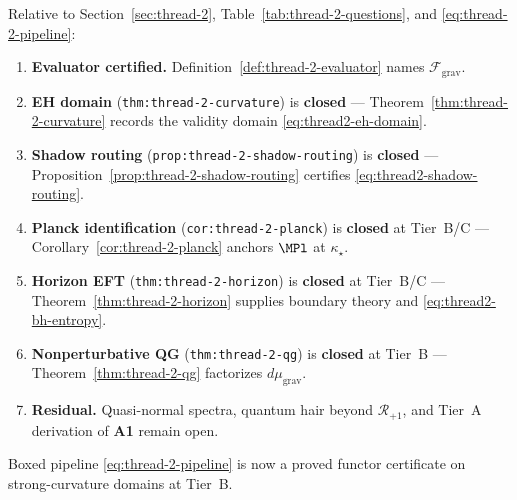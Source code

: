 \begin{corollary}
\label{cor:thread-2-closure}
Relative to Section~\ref{sec:thread-2}, Table~\ref{tab:thread-2-questions},
and \eqref{eq:thread-2-pipeline}:
\begin{enumerate}[label=(\roman*),leftmargin=*]
  \item \textbf{Evaluator certified.}
    Definition~\ref{def:thread-2-evaluator} names $\mathcal{F}_{\mathrm{grav}}$.
  \item \textbf{EH domain}
    (\texttt{thm:thread-2-curvature}) is \textbf{closed} ---
    Theorem~\ref{thm:thread-2-curvature} records the validity domain
    \eqref{eq:thread2-eh-domain}.
  \item \textbf{Shadow routing}
    (\texttt{prop:thread-2-shadow-routing}) is \textbf{closed} ---
    Proposition~\ref{prop:thread-2-shadow-routing} certifies
    \eqref{eq:thread2-shadow-routing}.
  \item \textbf{Planck identification}
    (\texttt{cor:thread-2-planck}) is \textbf{closed} at Tier~B/C ---
    Corollary~\ref{cor:thread-2-planck} anchors $\MPl$ at $\kappa_\star$.
  \item \textbf{Horizon EFT}
    (\texttt{thm:thread-2-horizon}) is \textbf{closed} at Tier~B/C ---
    Theorem~\ref{thm:thread-2-horizon} supplies boundary theory and
    \eqref{eq:thread2-bh-entropy}.
  \item \textbf{Nonperturbative QG}
    (\texttt{thm:thread-2-qg}) is \textbf{closed} at Tier~B ---
    Theorem~\ref{thm:thread-2-qg} factorizes $d\mu_{\mathrm{grav}}$.
  \item \textbf{Residual.} Quasi-normal spectra, quantum hair beyond
    $\mathcal{R}_{+1}$, and Tier~A derivation of \textbf{A1} remain open.
\end{enumerate}
Boxed pipeline \eqref{eq:thread-2-pipeline} is now a proved functor certificate
on strong-curvature domains at Tier~B.
\end{corollary}


